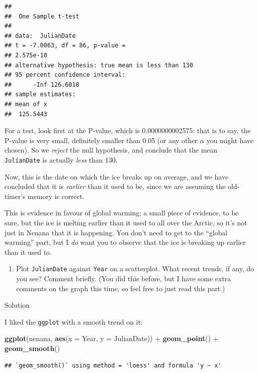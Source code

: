 \documentclass[]{tufte-book}
\newenvironment{Shaded}{}{}
\newcommand{\DataTypeTok}[1]{\textcolor[rgb]{0.56,0.13,0.00}{#1}}
\newcommand{\KeywordTok}[1]{\textcolor[rgb]{0.00,0.44,0.13}{\textbf{#1}}}
\newcommand{\NormalTok}[1]{#1}
\newcommand{\OperatorTok}[1]{\textcolor[rgb]{0.40,0.40,0.40}{#1}}
\newcommand{\StringTok}[1]{\textcolor[rgb]{0.25,0.44,0.63}{#1}}
\providecommand{\tightlist}{%
  \setlength{\itemsep}{0pt}\setlength{\parskip}{0pt}}
\theoremstyle{definition}
\theoremstyle{definition}
\theoremstyle{definition}
\theoremstyle{remark}
\begin{document}
\begin{verbatim}
## 
##  One Sample t-test
## 
## data:  JulianDate
## t = -7.0063, df = 86, p-value =
## 2.575e-10
## alternative hypothesis: true mean is less than 130
## 95 percent confidence interval:
##      -Inf 126.6018
## sample estimates:
## mean of x 
##  125.5443
\end{verbatim}

For a test, look first at the P-value, which is 0.0000000002575: that is
to say, the P-value is very small, definitely smaller than 0.05 (or any
other \(\alpha\) you might have chosen). So we \emph{reject} the null
hypothesis, and conclude that the mean \texttt{JulianDate} is actually
\emph{less} than 130.

Now, this is the date on which the ice breaks up on average, and we have
concluded that it is \emph{earlier} than it used to be, since we are
assuming the old-timer's memory is correct.

This is evidence in favour of global warming; a small piece of evidence,
to be sure, but the ice is melting earlier than it used to all over the
Arctic, so it's not just in Nenana that it is happening. You don't need
to get to the ``global warming'' part, but I \emph{do} want you to
observe that the ice is breaking up earlier than it used to.

\begin{enumerate}
\def\labelenumi{(\alph{enumi})}
\setcounter{enumi}{3}
\tightlist
\item
  Plot \texttt{JulianDate} against \texttt{Year} on a scatterplot. What
  recent trends, if any, do you see? Comment briefly. (You did this
  before, but I have some extra comments on the graph this time, so feel
  free to just read this part.)
\end{enumerate}

Solution

I liked the \texttt{ggplot} with a smooth trend on it:

\begin{Shaded}
\begin{Highlighting}[]
\KeywordTok{ggplot}\NormalTok{(nenana, }\KeywordTok{aes}\NormalTok{(}\DataTypeTok{x =}\NormalTok{ Year, }\DataTypeTok{y =}\NormalTok{ JulianDate)) }\OperatorTok{+}\StringTok{ }
\StringTok{    }\KeywordTok{geom_point}\NormalTok{() }\OperatorTok{+}\StringTok{ }\KeywordTok{geom_smooth}\NormalTok{()}
\end{Highlighting}
\end{Shaded}

\begin{verbatim}
## `geom_smooth()` using method = 'loess' and formula 'y ~ x'
\end{verbatim}
\end{document}
